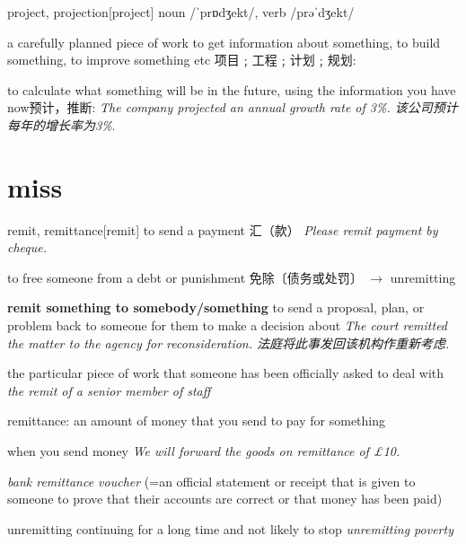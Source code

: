 \begin{DefWord}{project, projection}[project]
noun  /ˈprɒdʒekt/, verb /prəˈdʒekt/

a carefully planned piece of work to get information about something, to build something, to improve something etc 项目﹔工程﹔计划﹔规划:

to calculate what something will be in the future, using the information you have now预计，推断:
 \textit{The company projected an annual growth rate of 3\%. 该公司预计每年的增长率为3\%}. 

\end{DefWord}









\section{miss}

\begin{DefWord}{remit, remittance}[remit]
    to send a payment 汇（款）
    \textit{Please remit payment by cheque.}

    to free someone from a debt or punishment 免除〔债务或处罚〕 $\rightarrow$  unremitting

    \textbf{remit something to somebody/something}
    to send a proposal, plan, or problem back to someone for them to make a decision about
    \textit{The court remitted the matter to the agency for reconsideration. 法庭将此事发回该机构作重新考虑. }

    the particular piece of work that someone has been officially asked to deal with
    \textit{the remit of a senior member of staff}

    remittance: an amount of money that you send to pay for something

    when you send money
    \textit{We will forward the goods on remittance of £10.}

    \textit{bank remittance voucher} (=an official statement or receipt that is given to someone to prove that their accounts are correct or that money has been paid)
\end{DefWord}

\begin{DefWord}{unremitting}
    continuing for a long time and not likely to stop
    \textit{unremitting poverty}
\end{DefWord}

